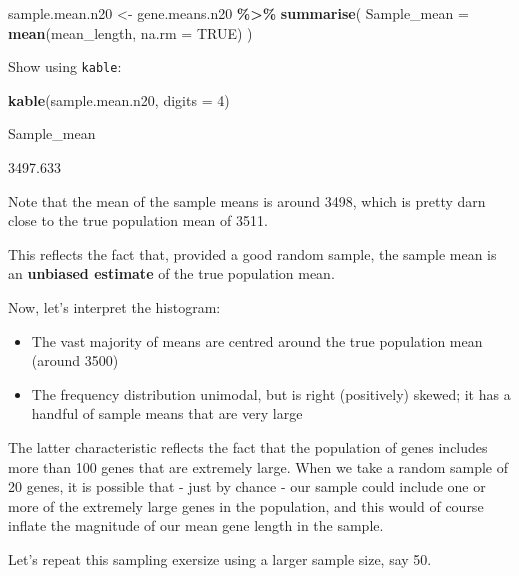 \documentclass[
]{book}
\newenvironment{Shaded}{\begin{snugshade}}{\end{snugshade}}
\newcommand{\AttributeTok}[1]{\textcolor[rgb]{0.13,0.29,0.53}{#1}}
\newcommand{\ConstantTok}[1]{\textcolor[rgb]{0.56,0.35,0.01}{#1}}
\newcommand{\DecValTok}[1]{\textcolor[rgb]{0.00,0.00,0.81}{#1}}
\newcommand{\FunctionTok}[1]{\textcolor[rgb]{0.13,0.29,0.53}{\textbf{#1}}}
\newcommand{\NormalTok}[1]{#1}
\newcommand{\OtherTok}[1]{\textcolor[rgb]{0.56,0.35,0.01}{#1}}
\newcommand{\SpecialCharTok}[1]{\textcolor[rgb]{0.81,0.36,0.00}{\textbf{#1}}}
\providecommand{\tightlist}{%
  \setlength{\itemsep}{0pt}\setlength{\parskip}{0pt}}
\begin{document}
\begin{Shaded}
\begin{Highlighting}[]
\NormalTok{sample.mean.n20 }\OtherTok{\textless{}{-}}\NormalTok{ gene.means.n20 }\SpecialCharTok{\%\textgreater{}\%}
  \FunctionTok{summarise}\NormalTok{(}
    \AttributeTok{Sample\_mean =} \FunctionTok{mean}\NormalTok{(mean\_length, }\AttributeTok{na.rm =} \ConstantTok{TRUE}\NormalTok{)}
\NormalTok{  )}
\end{Highlighting}
\end{Shaded}

Show using \texttt{kable}:

\begin{Shaded}
\begin{Highlighting}[]
\FunctionTok{kable}\NormalTok{(sample.mean.n20, }\AttributeTok{digits =} \DecValTok{4}\NormalTok{)}
\end{Highlighting}
\end{Shaded}

Sample\_mean

3497.633

Note that the mean of the sample means is around 3498, which is pretty darn close to the true population mean of 3511.

This reflects the fact that, provided a good random sample, the sample mean is an \textbf{unbiased estimate} of the true population mean.

Now, let's interpret the histogram:

\begin{itemize}
\tightlist
\item
  The vast majority of means are centred around the true population mean (around 3500)
\item
  The frequency distribution unimodal, but is right (positively) skewed; it has a handful of sample means that are very large
\end{itemize}

The latter characteristic reflects the fact that the population of genes includes more than 100 genes that are extremely large. When we take a random sample of 20 genes, it is possible that - just by chance - our sample could include one or more of the extremely large genes in the population, and this would of course inflate the magnitude of our mean gene length in the sample.

Let's repeat this sampling exersize using a larger sample size, say 50.
\end{document}
